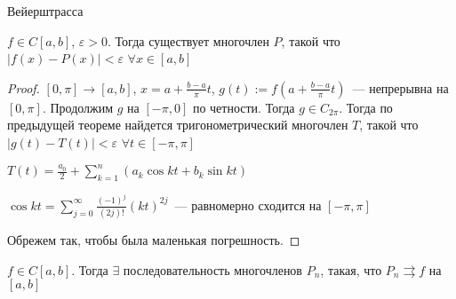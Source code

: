 \begin{theorem}
	Вейерштрасса
	
	$f \in C[a, b]$, $\varepsilon > 0$. Тогда существует многочлен $P$, такой что $|f(x) - P(x)| < \varepsilon$ $\forall x \in [a, b]$
\end{theorem}

\begin{proof}
	$[0, \pi] \rightarrow [a, b]$, $x = a + \frac{b - a}{\pi} t$, $g(t) := f(a + \frac{b - a}{\pi}t)$~--- непрерывна на $[0, \pi]$. Продолжим $g$ на $[-\pi, 0]$ по четности. Тогда $g \in C_{2\pi}$. Тогда по предыдущей теореме найдется тригонометрический многочлен $T$, такой что $|g(t) - T(t)| < \varepsilon$ $\forall t \in [-\pi, \pi]$
	
	$T(t) = \frac{a_0}{2} + \sum\limits_{k = 1}^{n} (a_k \cos kt + b_k \sin kt)$
	
	$\cos kt = \sum\limits_{j = 0}^{\infty} \frac{(-1)^j}{(2j)!}(kt)^{2j}$~--- равномерно сходится на $[-\pi, \pi]$
	
	Обрежем  так, чтобы была маленькая погрешность.	 
\end{proof}

\begin{consequence}
	$f \in C[a, b]$. Тогда $\exists$ последовательность многочленов $P_n$, такая, что $P_n \rightrightarrows f$ на $[a, b]$
\end{consequence}

\newpage

